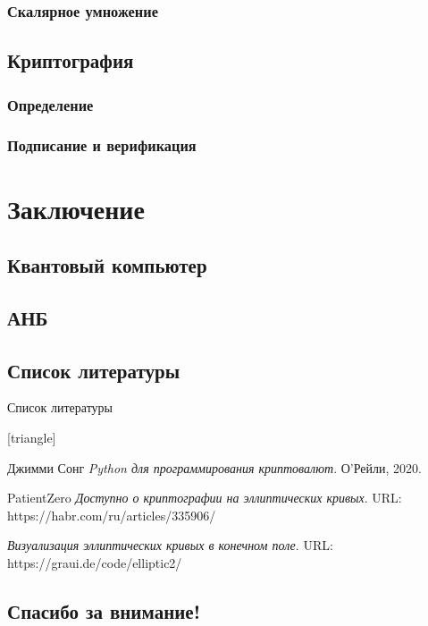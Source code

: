 \documentclass[aspectratio=169]{beamer}
\begin{document}
      \subsubsection{Скалярное умножение}
        
        
    \subsection{Криптография}
      \subsubsection{Определение}
        
        
        
      \subsubsection{Подписание и верификация}
        

  \section{Заключение}
    \subsection{Квантовый компьютер}
      
    \subsection{АНБ}
      
    \subsection{Список литературы}
    \begin{frame}{Список литературы}
      \begin{thebibliography}{9}
          [triangle]
          
          Джимми Сонг
          \emph{Python для программирования криптовалют}. 
          О'Рейли, 2020.
          
          PatientZero 
          \emph{Доступно о криптографии на эллиптических кривых}. 
          URL: https://habr.com/ru/articles/335906/
          
          \emph{Визуализация эллиптических кривых в конечном поле}. 
          URL: https://graui.de/code/elliptic2/
        \end{thebibliography}
      \end{frame}
    \subsection{Спасибо за внимание!}
      \begin{frame}
      \end{frame}
  
\end{document}
